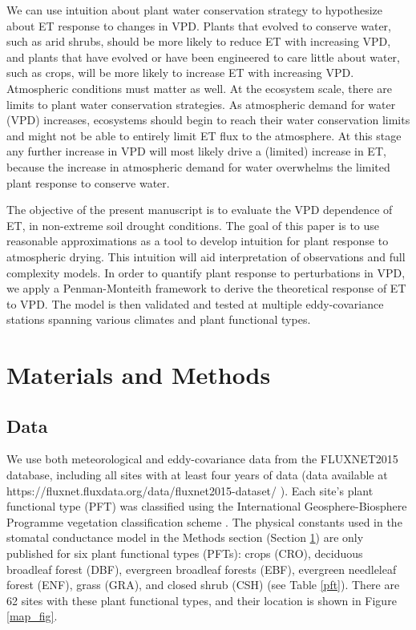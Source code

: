 \documentclass[draft,linenumbers]{gcbjournal}
\begin{document}
We can use intuition about plant water conservation strategy to hypothesize about ET response to changes in VPD. Plants that evolved to conserve water, such as arid shrubs, should be more likely to reduce ET with increasing VPD, and plants that have evolved or have been engineered to care little about water, such as crops, will be more likely to increase ET with increasing VPD. Atmospheric conditions must matter as well. At the ecosystem scale, there are limits to plant water conservation strategies. As atmospheric demand for water (VPD) increases, ecosystems should begin to reach their water conservation limits and might not be able to entirely limit ET flux to the atmosphere. At this stage any further increase in VPD will most likely drive a (limited) increase in ET, because the increase in atmospheric demand for water overwhelms the limited plant response to conserve water.

The objective of the present manuscript is to evaluate the VPD dependence of ET, in non-extreme soil drought conditions. The goal of this paper is to use reasonable approximations as a tool to develop intuition for plant response to atmospheric drying. This intuition will aid interpretation of observations and full complexity models. In order to quantify plant response to perturbations in VPD, we apply a Penman-Monteith framework to derive the theoretical response of ET to VPD. The model is then validated and tested at multiple eddy-covariance stations spanning various climates and plant functional types. 


\section{Materials and Methods}
\label{methods}
\subsection{Data}
\label{data}
We use both meteorological and eddy-covariance data from the FLUXNET2015 database, including all sites with at least four years of data (data available at \sloppy https://fluxnet.fluxdata.org/data/fluxnet2015-dataset/ \sloppy). Each site's plant functional type (PFT) was classified using the International Geosphere-Biosphere Programme vegetation classification scheme \citep{Loveland_1999}. The physical constants used in the stomatal conductance model in the Methods section (Section \ref{methods}) are only published for six plant functional types (PFTs): crops (CRO), deciduous broadleaf forest (DBF), evergreen broadleaf forests (EBF), evergreen needleleaf forest (ENF), grass (GRA), and closed shrub (CSH) (see Table \ref{pft}). There are 62 sites with these plant functional types, and their location is shown in  Figure \ref{map_fig}.
\end{document}
